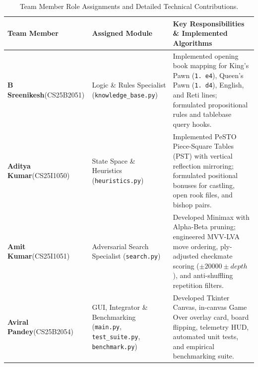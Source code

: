 \documentclass[11pt,a4paper]{article}
\begin{document}
\begin{table}[htbp]
\centering
\caption{Team Member Role Assignments and Detailed Technical Contributions.}
\label{tab:team_division}
\small
\renewcommand{\arraystretch}{1.3}
\begin{tabularx}{\textwidth}{L{3.0cm} L{3.6cm} Y}
\toprule
\textbf{Team Member} & \textbf{Assigned Module} & \textbf{Key Responsibilities \& Implemented Algorithms} \\
\midrule
\textbf{B Sreenikesh}\newline(CS25B2051) & Logic \& Rules Specialist (\texttt{knowledge\_base.py}) & Implemented opening book mapping for King's Pawn (\texttt{1. e4}), Queen's Pawn (\texttt{1. d4}), English, and Reti lines; formulated propositional rules and tablebase query hooks. \\
\addlinespace
\textbf{Aditya Kumar}\newline(CS25I1050) & State Space \& Heuristics (\texttt{heuristics.py}) & Implemented PeSTO Piece-Square Tables (PST) with vertical reflection mirroring; formulated positional bonuses for castling, open rook files, and bishop pairs. \\
\addlinespace
\textbf{Amit Kumar}\newline(CS25I1051)   & Adversarial Search Specialist (\texttt{search.py}) & Developed Minimax with Alpha-Beta pruning; engineered MVV-LVA move ordering, ply-adjusted checkmate scoring ($\pm 20000 \pm depth$), and anti-shuffling repetition filters. \\
\addlinespace
\textbf{Aviral Pandey}\newline(CS25B2054) & GUI, Integrator \& Benchmarking (\texttt{main.py}, \texttt{test\_suite.py}, \texttt{benchmark.py}) & Developed Tkinter Canvas, in-canvas Game Over overlay card, board flipping, telemetry HUD, automated unit tests, and empirical benchmarking suite. \\
\bottomrule
\end{tabularx}
\end{table}
\end{document}
